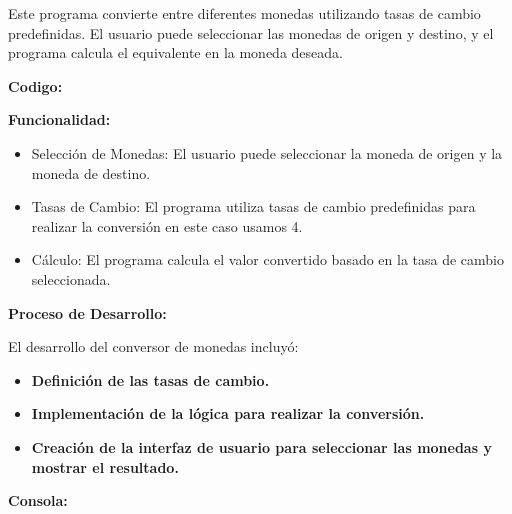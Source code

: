\documentclass[a4paper]{article}
\newcommand\textstyleListLabelxviii[1]{\textrm{\textbf{#1}}}
\begin{document}
{
Este programa convierte entre diferentes monedas utilizando tasas de cambio predefinidas. El usuario puede seleccionar
las monedas de origen y destino, y el programa calcula el equivalente en la moneda deseada.}

{
\textbf{Codigo:}}

\begin{center}
\end{center}

{
\textbf{Funcionalidad:}}

\begin{itemize}[series=listWWNumiv,label=\textstyleListLabelxviii{{}-}]
\item {
Selección de Monedas: El usuario puede seleccionar la moneda de origen y la moneda de destino.}
\item {
Tasas de Cambio: El programa utiliza tasas de cambio predefinidas para realizar la conversión en este caso usamos 4.}
\item {
Cálculo: El programa calcula el valor convertido basado en la tasa de cambio seleccionada.}
\end{itemize}
{
\textbf{Proceso de Desarrollo:}}

{
El desarrollo del conversor de monedas incluyó:}

\begin{itemize}[resume*=listWWNumiv]
\item {
\textbf{Definición de las tasas de cambio.}}
\item {
\textbf{Implementación de la lógica para realizar la conversión.}}
\item {
\textbf{Creación de la interfaz de usuario para seleccionar las monedas y mostrar el resultado.}}
\end{itemize}
{
\textbf{Consola:}}

\begin{center}
\end{center}
\begin{center}
\end{center}
\end{document}

